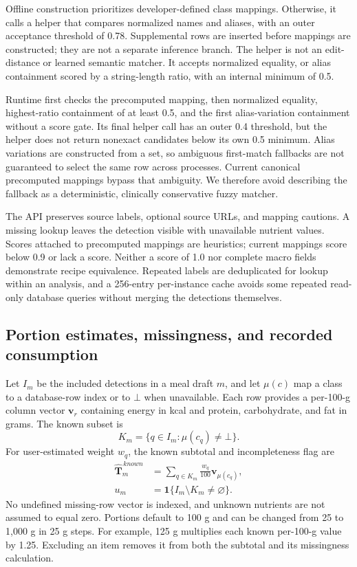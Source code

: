 \documentclass[12pt,journal,draftclsnofoot,onecolumn]{IEEEtran}
\begin{document}
Offline construction prioritizes developer-defined class mappings. Otherwise, it calls a helper that compares normalized names and aliases, with an outer acceptance threshold of 0.78. Supplemental rows are inserted before mappings are constructed; they are not a separate inference branch. The helper is not an edit-distance or learned semantic matcher. It accepts normalized equality, or alias containment scored by a string-length ratio, with an internal minimum of 0.5.

Runtime first checks the precomputed mapping, then normalized equality, highest-ratio containment of at least 0.5, and the first alias-variation containment without a score gate. Its final helper call has an outer 0.4 threshold, but the helper does not return nonexact candidates below its own 0.5 minimum. Alias variations are constructed from a set, so ambiguous first-match fallbacks are not guaranteed to select the same row across processes. Current canonical precomputed mappings bypass that ambiguity. We therefore avoid describing the fallback as a deterministic, clinically conservative fuzzy matcher.

The API preserves source labels, optional source URLs, and mapping cautions. A missing lookup leaves the detection visible with unavailable nutrient values. Scores attached to precomputed mappings are heuristics; \MappingReviewCount{} current mappings score below 0.9 or lack a score. Neither a score of 1.0 nor complete macro fields demonstrate recipe equivalence. Repeated labels are deduplicated for lookup within an analysis, and a 256-entry per-instance cache avoids some repeated read-only database queries without merging the detections themselves.

\subsection{Portion estimates, missingness, and recorded consumption}
Let $I_m$ be the included detections in a meal draft $m$, and let $\mu(c)$ map a class to a database-row index or to $\bot$ when unavailable. Each row provides a per-100-g column vector $\mathbf{v}_r$ containing energy in kcal and protein, carbohydrate, and fat in grams. The known subset is
\begin{equation}
K_m=\{q\in I_m:\mu(c_q)\ne\bot\}.
\end{equation}
For user-estimated weight $w_q$, the known subtotal and incompleteness flag are
\begin{align}
\widehat{\mathbf{T}}_m^{\,known}
 &=\sum_{q\in K_m}\frac{w_q}{100}\mathbf{v}_{\mu(c_q)},\label{eq:portion}\\
u_m&=\mathbf{1}\{I_m\setminus K_m\ne\varnothing\}.\label{eq:missing}
\end{align}
No undefined missing-row vector is indexed, and unknown nutrients are not assumed to equal zero. Portions default to 100 g and can be changed from 25 to 1,000 g in 25 g steps. For example, 125 g multiplies each known per-100-g value by 1.25. Excluding an item removes it from both the subtotal and its missingness calculation.
\end{document}

